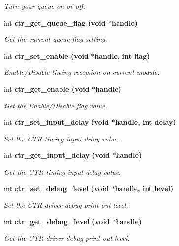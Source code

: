 \begin{CompactItemize}
\begin{CompactList}\small\item\em Turn your queue on or off. \item\end{CompactList}\item 
int \bf{ctr\_\-get\_\-queue\_\-flag} (void $\ast$handle)
\begin{CompactList}\small\item\em Get the current queue flag setting. \item\end{CompactList}\item 
int \bf{ctr\_\-set\_\-enable} (void $\ast$handle, int flag)
\begin{CompactList}\small\item\em Enable/Disable timing reception on current module. \item\end{CompactList}\item 
int \bf{ctr\_\-get\_\-enable} (void $\ast$handle)
\begin{CompactList}\small\item\em Get the Enable/Disable flag value. \item\end{CompactList}\item 
int \bf{ctr\_\-set\_\-input\_\-delay} (void $\ast$handle, int delay)
\begin{CompactList}\small\item\em Set the CTR timing input delay value. \item\end{CompactList}\item 
int \bf{ctr\_\-get\_\-input\_\-delay} (void $\ast$handle)
\begin{CompactList}\small\item\em Get the CTR timing input delay value. \item\end{CompactList}\item 
int \bf{ctr\_\-set\_\-debug\_\-level} (void $\ast$handle, int level)
\begin{CompactList}\small\item\em Set the CTR driver debug print out level. \item\end{CompactList}\item 
int \bf{ctr\_\-get\_\-debug\_\-level} (void $\ast$handle)
\begin{CompactList}\small\item\em Get the CTR driver debug print out level. \item\end{CompactList}\item 

\end{CompactItemize}
